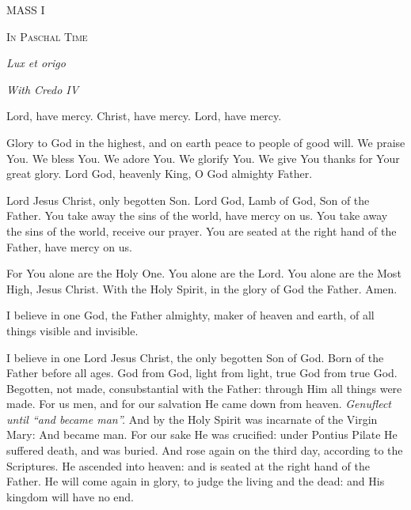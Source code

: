 \documentclass[11pt]{article} %
\begin{document}
\begin{center}\begin{huge}\textsc{MASS I}\end{huge}\end{center}
\begin{center}\begin{huge}\textsc{In Paschal Time}\end{huge}\end{center}
\begin{center}\begin{huge}\emph{Lux et origo}\end{huge}\end{center}
\begin{center}\begin{large}\emph{With Credo IV}\end{large}\end{center}

\def\greinitialformat#1{%
{\fontsize{34}{34}\selectfont #1}%
}

\vskip30pt

Lord, have mercy. Christ, have mercy. Lord, have mercy.

\vskip20pt

Glory to God in the highest, and on earth peace to people of good will.  We praise You.  We bless You.  We adore You.  We glorify You.  We give You thanks for Your great glory.  Lord God, heavenly King, O God almighty Father.

Lord Jesus Christ, only begotten Son.  Lord God, Lamb of God, Son of the Father.  You take away the sins of the world, have mercy on us.  You take away the sins of the world, receive our prayer.  You are seated at the right hand of the Father, have mercy on us.

For You alone are the Holy One.  You alone are the Lord.  You alone are the Most High, Jesus Christ.  With the Holy Spirit, in the glory of God the Father.  Amen.

\vskip20pt

I believe in one God, the Father almighty, maker of heaven and earth, of all things visible and invisible.

I believe in one Lord Jesus Christ, the only begotten Son of God.  Born of the Father before all ages.  God from God, light from light, true God from true God.  Begotten, not made, consubstantial with the Father: through Him all things were made.  For us men, and for our salvation He came down from heaven. \emph{Genuflect until ``and became man''.}  And by the Holy Spirit was incarnate of the Virgin Mary:  And became man.  For our sake He was crucified: under Pontius Pilate He suffered death, and was buried.  And rose again on the third day, according to the Scriptures.  He ascended into heaven: and is seated at the right hand of the Father.  He will come again in glory, to judge the living and the dead: and His kingdom will have no end.
\end{document}
